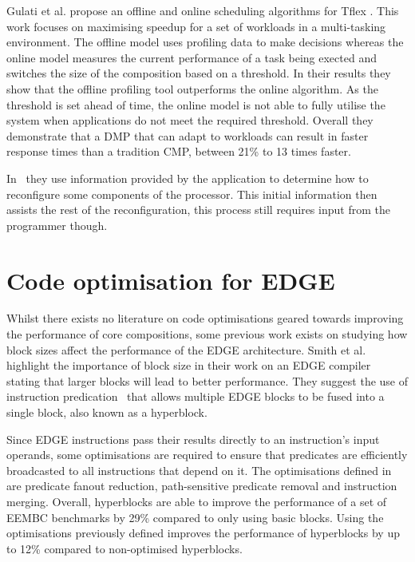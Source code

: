Gulati et al. propose an offline and online scheduling algorithms for Tflex \cite{gulati2008multitaskingdmc}. 
This work focuses on maximising speedup for a set of workloads in a multi-tasking environment.
The offline model uses profiling data to make decisions whereas the online model measures the current performance of a task being exected and switches the size of the composition based on a threshold.
In their results they show that the offline profiling tool outperforms the online algorithm.
As the threshold is set ahead of time, the online model is not able to fully utilise the system when applications do not meet the required threshold.
Overall they demonstrate that a DMP that can adapt to workloads can result in faster response times than a tradition CMP, between 21\% to 13 times faster.

In~\cite{santos2013nocdmc} they use information provided by the application to determine how to reconfigure some components of the processor.
This initial information then assists the rest of the reconfiguration, this process still requires input from the programmer though.

\section{Code optimisation for EDGE}

Whilst there exists no literature on code optimisations geared towards improving the performance of core compositions, some previous work exists on studying how block sizes affect the performance of the EDGE architecture.
Smith et al. highlight the importance of block size in their work on an EDGE compiler ~\cite{smith2006edge} stating that larger blocks will lead to better performance.
They suggest the use of instruction predication~\cite{smith2006dataflowpred} that allows multiple EDGE blocks to be fused into a single block, also known as a hyperblock.

Since EDGE instructions pass their results directly to an instruction's input operands, some optimisations are required to ensure that predicates are efficiently broadcasted to all instructions that depend on it.
The optimisations defined in ~\cite{smith2006dataflowpred} are predicate fanout reduction, path-sensitive predicate removal and instruction merging.
Overall, hyperblocks are able to improve the performance of a set of EEMBC benchmarks by 29\% compared to only using basic blocks.
Using the optimisations previously defined improves the performance of hyperblocks by up to 12\% compared to non-optimised hyperblocks.



